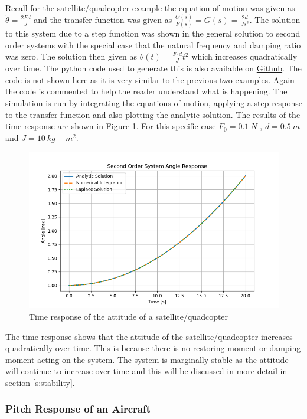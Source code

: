 Recall for the satellite/quadcopter example the equation of motion was given as $\ddot{\theta} = \frac{2F d}{J}$ and the transfer function was given as $\frac{\Theta(s)}{F(s)}= G(s) = \frac{2d}{Js^2}$. The solution to this system due to a step function was shown in the general solution to second order systems with the special case that the natural frequency and damping ratio was zero. The solution then given as $\theta(t) = \frac{F_0 d}{J} t^2$ which increases quadratically over time. The python code used to generate this is also available on \href{https://github.com/cmontalvo251/Python/blob/master/controls/satellite.py}{Github}. The code is not shown here as it is very similar to the previous two examples. Again the code is commented to help the reader understand what is happening. The simulation is run by integrating the equations of motion, applying a step response to the transfer function and also plotting the analytic solution. The results of the time response are shown in Figure \ref{f:satellite_response}. For this specific case $F_0=0.1~N$ , $d=0.5~m$ and $J=10~kg-m^2$.
\begin{figure}[H]
\centering
\includegraphics[width=0.8\linewidth]{Figures/satellite_response.png}
\caption{Time response of the attitude of a satellite/quadcopter}
\label{f:satellite_response}
\end{figure}
\noindent The time response shows that the attitude of the satellite/quadcopter increases quadratically over time. This is because there is no restoring moment or damping moment acting on the system. The system is marginally stable as the attitude will continue to increase over time and this will be discussed in more detail in section \ref{s:stability}.

\subsubsection{Pitch Response of an Aircraft}\label{s:aircraft_pitch_response}


